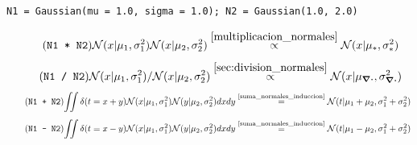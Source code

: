 \documentclass[a4paper,10pt]{book}
\newcommand{\N}{\mathcal{N}}
\theoremstyle{definition}
\newif\ifen
\newif\ifes
\newcommand{\en}[1]{\ifen#1\fi}
\newcommand{\es}[1]{\ifes#1\fi}
\begin{document}
\en{The \texttt{Gaussian} class does most of the computation of the packages. }%
\es{La clase \texttt{Gaussian} realiza la mayor parte del c\'omputo en todos los paquetes. }%
%
\en{It is characterized by the mean (\texttt{mu}) and the standard deviation (\texttt{sigma}). }%
\es{Se representa mediante dos par\'ametros, la media y el desv\'io estandar. }%
\begin{lstlisting}[backgroundcolor=\color{all},label=lst:N1_N2, caption={\en{Initialization of Gaussians distributions}\es{Inicialización de distirbuciones gaussianas}}, belowskip=-1.0 \baselineskip, aboveskip=-0 \baselineskip]
\end{lstlisting}
\begin{lstlisting}[backgroundcolor=\color{all}, belowskip=0.0 \baselineskip]
N1 = Gaussian(mu = 1.0, sigma = 1.0); N2 = Gaussian(1.0, 2.0)  
\end{lstlisting}
%
\en{The class overwrites the addition (\texttt{+}), subtraction (\texttt{-}), product (\texttt{*}), and division (\texttt{/}) to compute the marginal distributions used in the TrueSkill Through Time model. }%
\es{La clase sobreescribe los operadores suma (\texttt{+}), resta (\texttt{-}), producto (\texttt{*}) y divisi\'on (\texttt{/}) con las principales propiedades requeridas para computar las distribuciones marginales en el modelo TrueSkill Through Time. }%
%
\begin{equation*} \tag{\texttt{N1 * N2}}
 \N(x|\mu_1,\sigma_1^2)\N(x|\mu_2,\sigma_2^2) \overset{\ref{multiplicacion_normales}}{\propto} \N(x|\mu_{*},\sigma_{*}^2)
\end{equation*}
%
\begin{equation*} \tag{\texttt{N1 / N2}}
 \N(x|\mu_1,\sigma_1^2)/\N(x|\mu_2,\sigma_2^2)  \overset{\ref{sec:division_normales}}{\propto} \N(x|\mu_{\div},\sigma_{\div}^2)
\end{equation*} 
%
\vspace{-0.3cm}
%
\begin{equation*} \tag{\texttt{N1 + N2}} \label{eq:suma_normales}
\begin{split}
\iint \delta(t=x + y) \N(x|\mu_1, \sigma_1^2)\N(y|\mu_2, \sigma_2^2) dxdy \overset{\text{\ref{suma_normales_induccion}}}{=} \N(t|\mu_1+\mu_2,\sigma_1^2 + \sigma_2^2)
\end{split}
\end{equation*}
%
\vspace{-0.5cm}
%
\begin{equation*} \tag{\texttt{N1 - N2}} \label{eq:resta_normales}
\begin{split}
\iint \delta(t = x - y) \N(x|\mu_1, \sigma_1^2)\N(y|\mu_2, \sigma_2^2) dxdy \overset{\text{\ref{suma_normales_induccion}}}{=} \N(t|\mu_1 - \mu_2,\sigma_1^2 + \sigma_2^2)
\end{split}
\end{equation*}
%
\en{Although these properties are widely known, we attach their complete demonstrations in the supplemental material. }%
\es{Aunque estas propiedades son ampliamente conocidas, adjuntamos sus demostraciones completas en el material suplementario. }%
\end{document}
